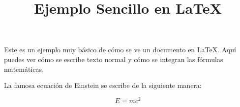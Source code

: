\documentclass{article}
\title{Ejemplo Sencillo en LaTeX}
\author{}
\date{}
\begin{document}
\maketitle

Este es un ejemplo muy básico de cómo se ve un documento en \LaTeX. Aquí puedes ver cómo se escribe texto normal y cómo se integran las fórmulas matemáticas.

La famosa ecuación de Einstein se escribe de la siguiente manera:

\[
E = mc^2
\]
\end{document}
